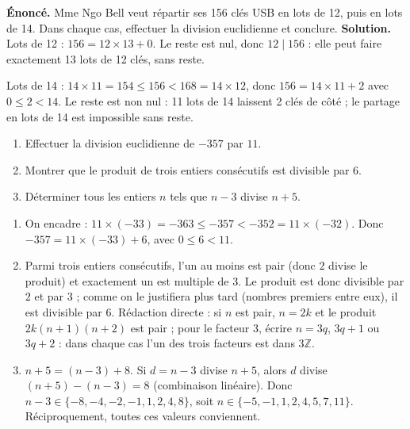 \documentclass[11pt]{article}
\begin{document}
\begin{exoresolu}
\textbf{Énoncé.} Mme Ngo Bell veut répartir ses 156 clés USB en lots de 12, puis en lots de 14. Dans chaque cas, effectuer la division euclidienne et conclure.
\tcblower
\textbf{Solution.} Lots de 12 : $156 = 12 \times 13 + 0$. Le reste est nul, donc $12 \mid 156$ : elle peut faire exactement 13 lots de 12 clés, sans reste.

Lots de 14 : $14 \times 11 = 154 \leq 156 < 168 = 14 \times 12$, donc $156 = 14 \times 11 + 2$ avec $0 \leq 2 < 14$. Le reste est non nul : 11 lots de 14 laissent 2 clés de côté ; le partage en lots de 14 est impossible sans reste.
\end{exoresolu}

\begin{exercice}
\begin{enumerate}
\item Effectuer la division euclidienne de $-357$ par $11$.
\item Montrer que le produit de trois entiers consécutifs est divisible par 6.
\item Déterminer tous les entiers $n$ tels que $n - 3$ divise $n + 5$.
\end{enumerate}
\end{exercice}

\begin{corrige}[Exercice 1]
\begin{enumerate}
\item On encadre : $11 \times (-33) = -363 \leq -357 < -352 = 11 \times (-32)$. Donc $-357 = 11 \times (-33) + 6$, avec $0 \leq 6 < 11$.
\item Parmi trois entiers consécutifs, l'un au moins est pair (donc $2$ divise le produit) et exactement un est multiple de $3$. Le produit est donc divisible par $2$ et par $3$ ; comme on le justifiera plus tard (nombres premiers entre eux), il est divisible par $6$. Rédaction directe : si $n$ est pair, $n = 2k$ et le produit $2k(n+1)(n+2)$ est pair ; pour le facteur 3, écrire $n = 3q$, $3q+1$ ou $3q+2$ : dans chaque cas l'un des trois facteurs est dans $3\mathbb{Z}$.
\item $n + 5 = (n - 3) + 8$. Si $d = n - 3$ divise $n + 5$, alors $d$ divise $(n+5) - (n-3) = 8$ (combinaison linéaire). Donc $n - 3 \in \{-8, -4, -2, -1, 1, 2, 4, 8\}$, soit $n \in \{-5, -1, 1, 2, 4, 5, 7, 11\}$. Réciproquement, toutes ces valeurs conviennent.
\end{enumerate}
\end{corrige}
\end{document}
